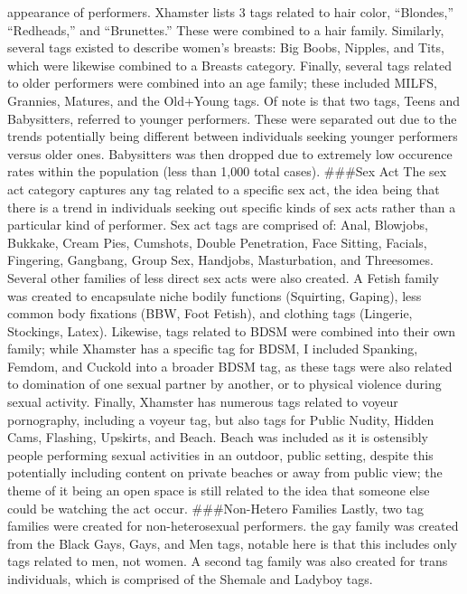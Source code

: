 \documentclass[11pt,]{article}
\begin{document}
appearance of performers. Xhamster lists 3 tags related to hair color,
``Blondes,'' ``Redheads,'' and ``Brunettes.'' These were combined to a
hair family. Similarly, several tags existed to describe women's
breasts: Big Boobs, Nipples, and Tits, which were likewise combined to a
Breasts category. Finally, several tags related to older performers were
combined into an age family; these included MILFS, Grannies, Matures,
and the Old+Young tags. Of note is that two tags, Teens and Babysitters,
referred to younger performers. These were separated out due to the
trends potentially being different between individuals seeking younger
performers versus older ones. Babysitters was then dropped due to
extremely low occurence rates within the population (less than 1,000
total cases). \#\#\#Sex Act The sex act category captures any tag
related to a specific sex act, the idea being that there is a trend in
individuals seeking out specific kinds of sex acts rather than a
particular kind of performer. Sex act tags are comprised of: Anal,
Blowjobs, Bukkake, Cream Pies, Cumshots, Double Penetration, Face
Sitting, Facials, Fingering, Gangbang, Group Sex, Handjobs,
Masturbation, and Threesomes.\\
Several other families of less direct sex acts were also created. A
Fetish family was created to encapsulate niche bodily functions
(Squirting, Gaping), less common body fixations (BBW, Foot Fetish), and
clothing tags (Lingerie, Stockings, Latex). Likewise, tags related to
BDSM were combined into their own family; while Xhamster has a specific
tag for BDSM, I included Spanking, Femdom, and Cuckold into a broader
BDSM tag, as these tags were also related to domination of one sexual
partner by another, or to physical violence during sexual activity.
Finally, Xhamster has numerous tags related to voyeur pornography,
including a voyeur tag, but also tags for Public Nudity, Hidden Cams,
Flashing, Upskirts, and Beach. Beach was included as it is ostensibly
people performing sexual activities in an outdoor, public setting,
despite this potentially including content on private beaches or away
from public view; the theme of it being an open space is still related
to the idea that someone else could be watching the act occur.
\#\#\#Non-Hetero Families Lastly, two tag families were created for
non-heterosexual performers. the gay family was created from the Black
Gays, Gays, and Men tags, notable here is that this includes only tags
related to men, not women. A second tag family was also created for
trans individuals, which is comprised of the Shemale and Ladyboy tags.
\end{document}

